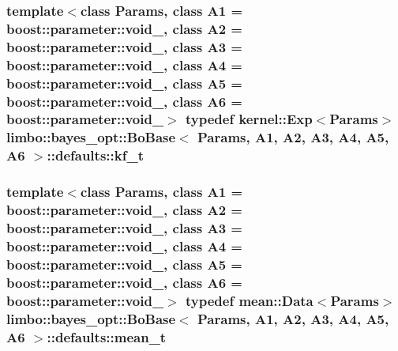 \subsubsection[{kf\+\_\+t}]{\setlength{\rightskip}{0pt plus 5cm}template$<$class Params, class A1 = boost\+::parameter\+::void\+\_\+, class A2 = boost\+::parameter\+::void\+\_\+, class A3 = boost\+::parameter\+::void\+\_\+, class A4 = boost\+::parameter\+::void\+\_\+, class A5 = boost\+::parameter\+::void\+\_\+, class A6 = boost\+::parameter\+::void\+\_\+$>$ typedef {\bf kernel\+::\+Exp}$<$Params$>$ {\bf limbo\+::bayes\+\_\+opt\+::\+Bo\+Base}$<$ Params, A1, A2, A3, A4, A5, A6 $>$\+::{\bf defaults\+::kf\+\_\+t}}\label{structlimbo_1_1bayes__opt_1_1_bo_base_1_1defaults_a0a88a267bef731645079455cb11fa836}
\hypertarget{structlimbo_1_1bayes__opt_1_1_bo_base_1_1defaults_ae66c699015cb936c8c429c64154bf202}{}
\subsubsection[{mean\+\_\+t}]{\setlength{\rightskip}{0pt plus 5cm}template$<$class Params, class A1 = boost\+::parameter\+::void\+\_\+, class A2 = boost\+::parameter\+::void\+\_\+, class A3 = boost\+::parameter\+::void\+\_\+, class A4 = boost\+::parameter\+::void\+\_\+, class A5 = boost\+::parameter\+::void\+\_\+, class A6 = boost\+::parameter\+::void\+\_\+$>$ typedef {\bf mean\+::\+Data}$<$Params$>$ {\bf limbo\+::bayes\+\_\+opt\+::\+Bo\+Base}$<$ Params, A1, A2, A3, A4, A5, A6 $>$\+::{\bf defaults\+::mean\+\_\+t}}\label{structlimbo_1_1bayes__opt_1_1_bo_base_1_1defaults_ae66c699015cb936c8c429c64154bf202}
\hypertarget{structlimbo_1_1bayes__opt_1_1_bo_base_1_1defaults_a07f65b6332c4f0c029069100feecb789}{}
